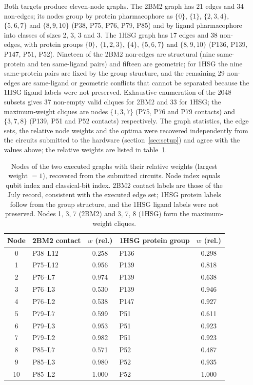 \documentclass{iopjournal}
\begin{document}
Both targets produce eleven-node graphs. The 2BM2 graph has 21 edges and 34 non-edges; its nodes group by protein pharmacophore as $\{0\}$, $\{1\}$, $\{2,3,4\}$, $\{5,6,7\}$ and $\{8,9,10\}$ (P38, P75, P76, P79, P85) and by ligand pharmacophore into classes of sizes 2, 3, 3 and 3. The 1HSG graph has 17 edges and 38 non-edges, with protein groups $\{0\}$, $\{1,2,3\}$, $\{4\}$, $\{5,6,7\}$ and $\{8,9,10\}$ (P136, P139, P147, P51, P52). Nineteen of the 2BM2 non-edges are structural (nine same-protein and ten same-ligand pairs) and fifteen are geometric; for 1HSG the nine same-protein pairs are fixed by the group structure, and the remaining 29 non-edges are same-ligand or geometric conflicts that cannot be separated because the 1HSG ligand labels were not preserved. Exhaustive enumeration of the 2048 subsets gives 37 non-empty valid cliques for 2BM2 and 33 for 1HSG; the maximum-weight cliques are nodes $\{1,3,7\}$ (P75, P76 and P79 contacts) and $\{3,7,8\}$ (P139, P51 and P52 contacts) respectively. The graph statistics, the edge sets, the relative node weights and the optima were recovered independently from the circuits submitted to the hardware (section~\ref{sec:setup}) and agree with the values above; the relative weights are listed in table~\ref{tab:nodes}.
\begin{table}[htbp]
\caption{Nodes of the two executed graphs with their relative weights (largest weight $=1$), recovered from the submitted circuits. Node index equals qubit index and classical-bit index. 2BM2 contact labels are those of the July record, consistent with the executed edge set; 1HSG protein labels follow from the group structure, and the 1HSG ligand labels were not preserved. Nodes 1, 3, 7 (2BM2) and 3, 7, 8 (1HSG) form the maximum-weight cliques.}
\label{tab:nodes}
\centering
\begin{tabular}{@{}clclc@{}}
\toprule
Node & 2BM2 contact & $w$ (rel.) & 1HSG protein group & $w$ (rel.) \\
\midrule
0 & P38--L12 & 0.258 & P136 & 0.298 \\
1 & P75--L12 & 0.956 & P139 & 0.818 \\
2 & P76--L7 & 0.974 & P139 & 0.638 \\
3 & P76--L3 & 0.530 & P139 & 0.946 \\
4 & P76--L2 & 0.538 & P147 & 0.927 \\
5 & P79--L7 & 0.599 & P51 & 0.611 \\
6 & P79--L3 & 0.953 & P51 & 0.923 \\
7 & P79--L2 & 0.982 & P51 & 0.923 \\
8 & P85--L7 & 0.571 & P52 & 0.487 \\
9 & P85--L3 & 0.980 & P52 & 0.935 \\
10 & P85--L2 & 1.000 & P52 & 1.000 \\
\bottomrule
\end{tabular}
\end{table}
\end{document}
